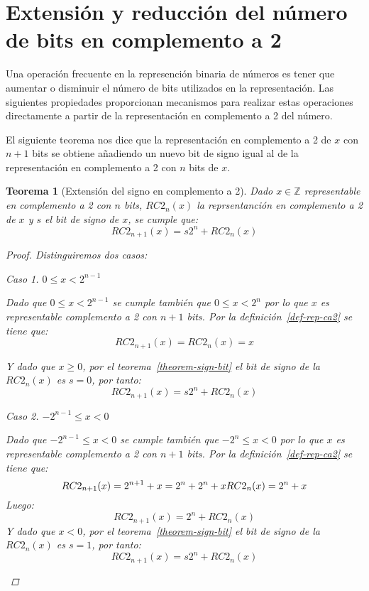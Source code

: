 \documentclass[spanish,a4paper,12pt,titlepage]{article}
\newtheorem{theorem}{Teorema}%
\theoremstyle{definition}
\theoremstyle{remark}
\newtheorem{case}{Caso}
\newcommand{\bbZ}{\mathbb{Z}}
\begin{document}
\section{Extensión y reducción del número de bits en complemento a 2}

Una operación frecuente en la represención binaria de números es tener que aumentar o disminuir el número de bits utilizados en la representación. Las siguientes propiedades proporcionan mecanismos para realizar estas operaciones directamente a partir de la representación en complemento a 2 del número.

El siguiente teorema nos dice que la representación en complemento a 2 de $x$ con $n+1$ bits se obtiene añadiendo un nuevo bit de signo igual al de la representación en complemento a 2 con $n$ bits de $x$.

\begin{theorem}[Extensión del signo en complemento a 2]
  Dado $x \in \bbZ$ representable en complemento a 2 con $n$ bits, $RC2_n(x)$ la reprsentanción en complemento a 2 de $x$ y $s$ el bit de signo de $x$, se cumple que:
  \[
      RC2_{n+1}(x) = s 2^n + RC2_n(x)
  \]
  \begin{proof}
      Distinguiremos dos casos:
    \begin{case}
      $0 \le x < 2^{n-1}$

      Dado que $0 \le x < 2^{n-1}$ se cumple también que $0 \le x < 2^n$ por lo que $x$ es representable complemento a 2 con $n+1$ bits. Por la definición~\ref{def-rep-ca2} se tiene que:
      \[
        RC2_{n+1}(x) = RC2_n(x) = x
      \]

      Y dado que $x \ge 0$, por el teorema~\ref{theorem-sign-bit} el bit de signo de la $RC2_n(x)$ es $s=0$, por tanto:
      \[
        RC2_{n+1}(x) = s 2^n + RC2_n(x)
      \]
    \end{case}
    \begin{case}
      $-2^{n-1} \le x < 0$

      Dado que $-2^{n-1} \le x < 0$ se cumple también que $-2^n \le x < 0$ por lo que $x$ es representable complemento a 2 con $n+1$ bits. Por la definición~\ref{def-rep-ca2} se tiene que:
      \[
        RC2_{n+1}(x) = 2^{n+1} + x = 2^n + 2^n + x\\
        RC2_n(x) = 2^n + x
      \]
      Luego:
      \[
        RC2_{n+1}(x) = 2^n + RC2_n(x)
      \]
      Y dado que $x < 0$, por el teorema~\ref{theorem-sign-bit} el bit de signo de la $RC2_n(x)$ es $s=1$, por tanto:
      \[
        RC2_{n+1}(x) = s 2^n + RC2_n(x)
      \]
    \end{case}
  \end{proof}
\end{theorem}
\end{document}
